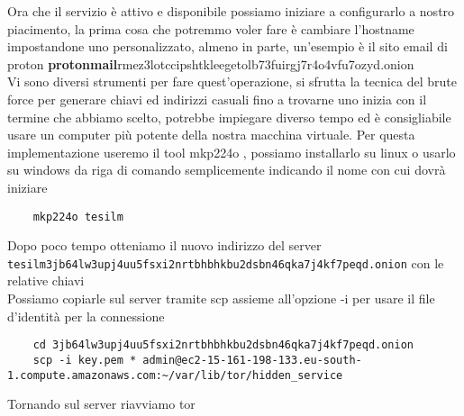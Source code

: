 Ora che il servizio è attivo e disponibile possiamo iniziare a configurarlo a nostro piacimento, la prima cosa che potremmo voler fare è cambiare l'hostname impostandone uno personalizzato, almeno in parte, un'esempio è il sito email di proton \textbf{protonmail}rmez3lotccipshtkleegetolb73fuirgj7r4o4vfu7ozyd.onion \\
Vi sono diversi strumenti per fare quest'operazione, si sfrutta la tecnica del brute force per generare chiavi ed indirizzi casuali fino a trovarne uno inizia con il termine che abbiamo scelto, potrebbe impiegare diverso tempo ed è consigliabile usare un computer più potente della nostra macchina virtuale. 
Per questa implementazione useremo il tool mkp224o \cite{V3AddressGeneratorRepo}, possiamo installarlo su linux o usarlo su windows da riga di comando semplicemente indicando il nome con cui dovrà iniziare

\begin{lstlisting}
    mkp224o tesilm
\end{lstlisting}
    
Dopo poco tempo otteniamo il nuovo indirizzo del server \lstinline{tesilm3jb64lw3upj4uu5fsxi2nrtbhbhkbu2dsbn46qka7j4kf7peqd.onion} con le relative chiavi \\
Possiamo copiarle sul server tramite scp assieme all'opzione -i per usare il file d'identità per la connessione
    
\begin{lstlisting}
    cd 3jb64lw3upj4uu5fsxi2nrtbhbhkbu2dsbn46qka7j4kf7peqd.onion 
    scp -i key.pem * admin@ec2-15-161-198-133.eu-south-1.compute.amazonaws.com:~/var/lib/tor/hidden_service
\end{lstlisting}

Tornando sul server riavviamo tor 


